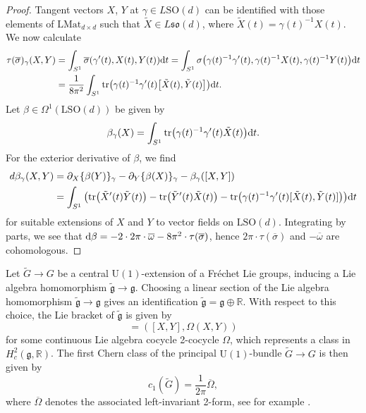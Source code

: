 \documentclass[11pt]{article}
\numberwithin{equation}{section}
\numberwithin{equation}{section}
\newcommand{\R}{\mathbb{R}}
\newcommand{\tr}{\mathrm{tr}}
\newcommand{\SO}{\mathrm{SO}}
\newcommand{\U}{\mathrm{U}}
\renewcommand{\L}{\mathrm{L}}
\begin{document}
\begin{proof}
Tangent vectors $X$, $Y$ at $\gamma \in L\SO(d)$ can be identified with those elements of $\L \mathrm{Mat}_{d\times d}$ such that $\tilde{X} \in L\mathfrak{so}(d)$, where $\tilde{X}(t) = \gamma(t)^{-1}X(t)$. We now calculate
 \begin{align*}
 \tau(\overline{\sigma})_\gamma(X, Y)
 &= \int_{S^1} \overline{\sigma}(\gamma^\prime(t), X(t), Y(t)) {\rm d}t= \int_{S^1} \sigma\big( \gamma(t)^{-1}\gamma^\prime(t), \gamma(t)^{-1} X(t), \gamma(t)^{-1}Y(t)\big) {\rm d}t\\
 &= \frac{1}{8 \pi^2}\int_{S^1}\tr\big(\gamma(t)^{-1}\gamma^\prime(t) \big[\tilde{X}(t), \tilde{Y}(t)\big]\big) {\rm d}t.
 \end{align*}
 Let $\beta \in \Omega^1(\L\SO(d))$ be given by
 \begin{equation*}
 \beta_\gamma(X) = \int_{S^1} \tr \big( 	\gamma(t)^{-1}\gamma^\prime(t) \tilde{X}(t)\big) {\rm d}t.
 \end{equation*}
For the exterior derivative of $\beta$, we find
 \begin{align*}
 d\beta_\gamma(X, Y) &= \partial_X \{ \beta(Y)\}_\gamma - \partial_Y \{ \beta(X)\}_\gamma - \beta_\gamma([X, Y]) \\
 &= \int_{S^1} \big( \tr \big(\tilde{X}^\prime(t) \tilde{Y}(t)\big) - \tr \big(\tilde{Y}^\prime(t) \tilde{X}(t)\big) - \tr\big(\gamma(t)^{-1}\gamma^\prime(t) [\tilde{X}(t), \tilde{Y}(t)]\big)\big) {\rm d}t
 \end{align*}
 for suitable extensions of $X$ and $Y$ to vector fields on $\L\SO(d)$.
 Integrating by parts, we see that ${\rm d} \beta = - 2 \cdot 2\pi \cdot \overline{\omega} - 8 \pi^2 \cdot \tau(\overline{\sigma})$, hence $2 \pi \cdot \tau(\overline{\sigma})$ and $-\overline{\omega}$ are cohomologous.
\end{proof}

Let $\tilde{G} \to G$ be a central $\U(1)$-extension of a Fr\'echet Lie groups, inducing a Lie algebra homomorphism $\tilde{\mathfrak{g}} \to \mathfrak{g}$.
Choosing a linear section of the Lie algebra homomorphism $\tilde{\mathfrak{g}} \to \mathfrak{g}$ gives an identification $\tilde{\mathfrak{g}} = \mathfrak{g} \oplus \R$.
With respect to this choice, the Lie bracket of $\tilde{\mathfrak{g}}$ is given by
\begin{equation*}
 	[(X, \lambda), (Y, \mu)] = ([X, Y], \Omega(X, Y))
\end{equation*}
for some continuous Lie algebra cocycle 2-cocycle $\Omega$, which represents a class in $H^2_c(\mathfrak{g}, \R)$.
The first Chern class of the principal $\U(1)$-bundle $\tilde{G} \to G$ is then given by
\begin{equation}
\label{ChernClassVsCocycle}
 c_1(\tilde{G}) = \frac{1}{2\pi} \overline{\Omega}, 	
\end{equation}
where $\overline{\Omega}$ denotes the associated left-invariant 2-form, see for example \cite[Proposition~4.5.6]{PressleySegal}.
\end{document}
